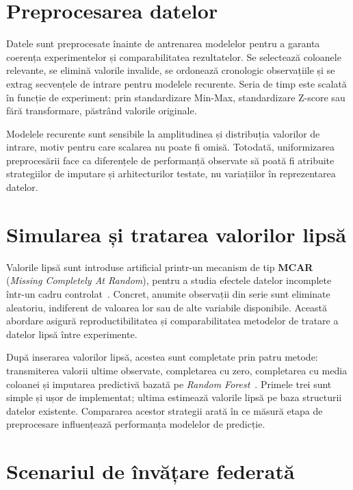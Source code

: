 \section{Preprocesarea datelor}

Datele sunt preprocesate înainte de antrenarea modelelor pentru a garanta coerența experimentelor și comparabilitatea rezultatelor. Se selectează coloanele relevante, se elimină valorile invalide, se ordonează cronologic observațiile și se extrag secvențele de intrare pentru modelele recurente. Seria de timp este scalată în funcție de experiment: prin standardizare Min-Max, standardizare Z-score sau fără transformare, păstrând valorile originale.

Modelele recurente sunt sensibile la amplitudinea și distribuția valorilor de intrare, motiv pentru care scalarea nu poate fi omisă. Totodată, uniformizarea preprocesării face ca diferențele de performanță observate să poată fi atribuite strategiilor de imputare și arhitecturilor testate, nu variațiilor în reprezentarea datelor.

\section{Simularea și tratarea valorilor lipsă}

Valorile lipsă sunt introduse artificial printr-un mecanism de tip \textbf{MCAR} (\textit{Missing Completely At Random}), pentru a studia efectele datelor incomplete într-un cadru controlat~\cite{rubin1976inference, little2002missing}. Concret, anumite observații din serie sunt eliminate aleatoriu, indiferent de valoarea lor sau de alte variabile disponibile. Această abordare asigură reproductibilitatea și comparabilitatea metodelor de tratare a datelor lipsă între experimente.

După inserarea valorilor lipsă, acestea sunt completate prin patru metode: transmiterea valorii ultime observate, completarea cu zero, completarea cu media coloanei și imputarea predictivă bazată pe \textit{Random Forest}~\cite{breiman2001rf, stekhoven2012missforest}. Primele trei sunt simple și ușor de implementat; ultima estimează valorile lipsă pe baza structurii datelor existente. Compararea acestor strategii arată în ce măsură etapa de preprocesare influențează performanța modelelor de predicție.

\section{Scenariul de învățare federată}

